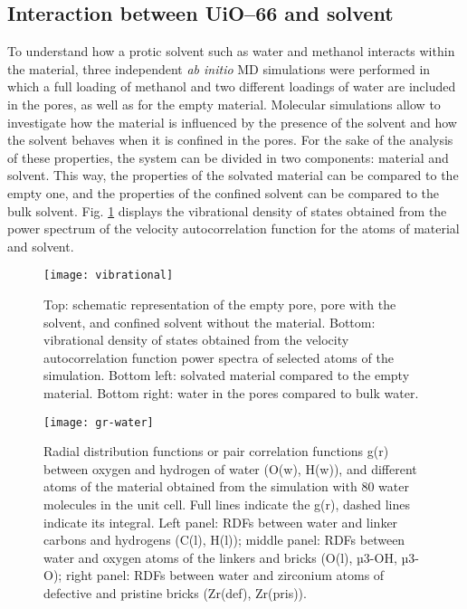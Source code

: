 \subsection*{Interaction between UiO--66 and solvent}
To understand how a protic solvent such as water and methanol interacts within the material, three independent \textit{ab initio} MD simulations were performed in which a full loading of methanol and two different loadings of water are included in the pores, as well as for the empty material. Molecular simulations allow to investigate how the material is influenced by the presence of the solvent and how the solvent behaves when it is confined in the pores. For the sake of the analysis of these properties, the system can be divided in two components: material and solvent. This way, the properties of the solvated material can be compared to the empty one, and the properties of the confined solvent can be compared to the bulk solvent. Fig. \ref{fig:vibrational} displays the vibrational density of states obtained from the power spectrum of the velocity autocorrelation function for the atoms of material and solvent. 
\npar
\begin{figure}[!htbp]
	\centering
	\texttt{[image: vibrational]}
	\caption{Top: schematic representation of the empty pore, pore with the solvent, and confined solvent without the material. Bottom: vibrational density of states obtained from the velocity autocorrelation function power spectra of selected atoms of the simulation. Bottom left: solvated material compared to the empty material. Bottom right: water in the pores compared to bulk water.}
	\label{fig:vibrational}
\end{figure}
\begin{figure}[!htbp]
	\centering
	\texttt{[image: gr-water]}
	\caption{Radial distribution functions or pair correlation functions g(r) between oxygen and hydrogen of water (O(w), H(w)), and different atoms of the material obtained from the simulation with 80 water molecules in the unit cell. Full lines indicate the g(r), dashed lines indicate its integral. Left panel: RDFs between water and linker carbons and hydrogens (C(l), H(l)); middle panel: RDFs between water and oxygen atoms of the linkers and bricks (O(l), µ3-OH, µ3-O); right panel: RDFs between water and zirconium atoms of defective and pristine bricks (Zr(def), Zr(pris)). }
	\label{fig:gr-water}
\end{figure}
